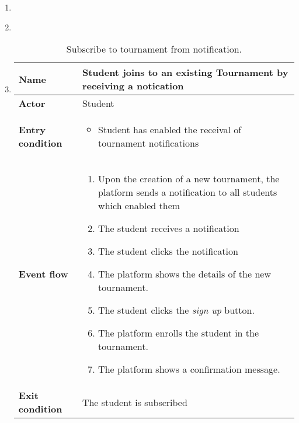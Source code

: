 \begin{enumerate}[label=\textbf{UC\arabic*}:,leftmargin=1.3cm]
    \item
    \item \textbf{}
          \pagebreak
    \item \textbf{}
          \begin{table}[H]
              \centering
              \begin{tabular}{|l|p{11.9cm}|}
                  \hline
                  \textbf{Name}            & Student joins to an existing Tournament by receiving a notication                     \\\hline
                  \textbf{Actor}           & Student                                                                               \\\hline
                  \textbf{Entry condition} &
                  \begin{itemize}
                      \item Student has enabled the receival of tournament notifications
                  \end{itemize}                                                \\\hline
                  \textbf{Event flow}      &
                  \begin{enumerate}[label=\arabic*.]
                      \item Upon the creation of a new tournament, the platform sends a notification to all students which enabled them
                      \item The student receives a notification
                      \item The student clicks the notification
                      \item The platform shows the details of the new tournament.
                      \item The student clicks the \emph{sign up} button.
                      \item The platform enrolls the student in the tournament.
                      \item The platform shows a confirmation message.
                  \end{enumerate} \\\hline
                  \textbf{Exit condition}  & The student is subscribed                                                             \\\hline
              \end{tabular}
              \caption{Subscribe to tournament from notification.}
              \label{table:Subscribe to tournament from notification}
          \end{table}


\end{enumerate}
